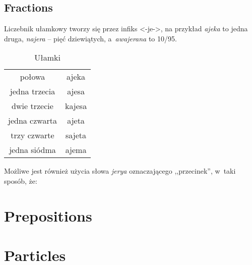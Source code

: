 \subsection{Fractions}

Liczebnik ułamkowy tworzy się przez infiks <-je->, na przykład \emph{ajeka} to
jedna druga, \emph{najera} -- pięć dziewiątych, a~\emph{awajerana} to 10/95.

\begin{table}[ht]
  \centering
  \caption{Ułamki}
  \begin{tabular}{cc} \toprule
    połowa        & ajeka  \\
    jedna trzecia & ajesa  \\
    dwie trzecie  & kajesa \\
    jedna czwarta & ajeta  \\
    trzy czwarte  & sajeta \\
    jedna siódma  & ajema  \\\bottomrule
  \end{tabular}
  \label{tab:numerals4}
\end{table}

Możliwe jest również użycia słowa \emph{jerya} oznaczającego ,,przecinek'',
w~taki sposób, że:


\section{Prepositions}

\section{Particles}